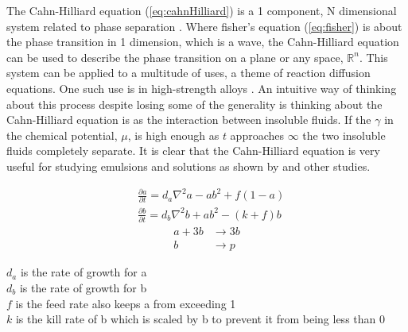 \documentclass[12pt, letterpaper]{article}
\begin{document}
The Cahn-Hilliard equation (\ref{eq:cahnHilliard}) is a 1 component, N dimensional system related to phase 
separation \citep{cahnhilliard}. Where fisher's equation (\ref{eq:fisher}) is about the phase transition in 1
dimension, which is a wave,
the Cahn-Hilliard equation can be used to describe the phase transition on a plane or any space,
$\mathbb{R}^n$. This system can be applied to a multitude of uses, a theme of reaction diffusion equations.
One such use is in high-strength alloys \citep{challoys}. An intuitive way of thinking about this process
despite losing some of the generality is thinking about the Cahn-Hilliard equation is as the interaction
between insoluble fluids. If the $\gamma$ in the chemical potential, $\mu$, is high enough as $t$ approaches
$\infty$ the two insoluble fluids completely separate. It is clear that the Cahn-Hilliard equation is very
useful for studying emulsions and solutions as shown by \cite{CHEmulsions} and other studies.  

\begin{singlespace}
  \begin{equation}\label{eq:grayscott}
    \begin{split}
      &\frac{\partial a}{\partial t} = d_a\nabla^2a − ab^2 + f(1−a) \\
      &\frac{\partial b}{\partial t} = d_b\nabla^2b + ab^2 − (k + f)b
    \end{split}
  \end{equation}
  \begin{equation}
    \begin{split}
      a + 3b &\rightarrow 3b \\
           b &\rightarrow p
    \end{split}
  \end{equation}
  \begin{small}
$d_a$ is the rate of growth for a \\
$d_b$ is the rate of growth for b \\
$f$ is the feed rate also keeps a from exceeding 1 \\
$k$ is the kill rate of b which is scaled by b to prevent it from being less than 0
  \end{small}
\end{singlespace}
\end{document}
